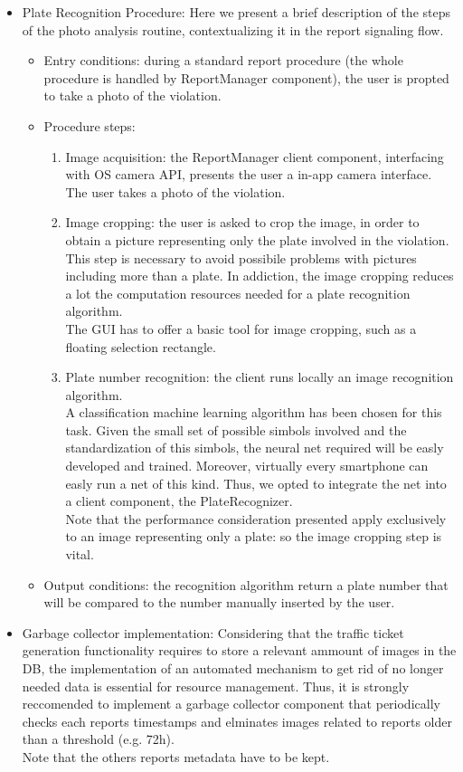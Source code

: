 \begin{itemize}
	\item Plate Recognition Procedure: Here we present a brief description of the steps of the photo analysis routine, contextualizing it in the report signaling flow.
	\begin{itemize}
		\item Entry conditions: during a standard report procedure (the whole procedure is handled by ReportManager component), the user is propted to take a photo of the violation.
		\item  Procedure steps:
		\begin{enumerate}
			\item Image acquisition: the ReportManager client component, interfacing with OS camera API, presents the user a in-app camera interface. The user takes a photo of the violation.
			\item Image cropping: the user is asked to crop the image, in order to obtain a picture representing only the plate involved in the violation. This step is necessary to avoid possibile problems with pictures including more than a plate. In addiction, the image cropping reduces a lot the computation resources needed for a plate recognition algorithm.\\
		The GUI has to offer a basic tool for image cropping, such as a floating selection rectangle.
			\item Plate number recognition:  the client runs locally an image recognition algorithm. \\
		A classification machine learning algorithm has been chosen for this task. Given the small set of possible simbols involved and the standardization of this simbols, the neural net required will be easly developed and trained. Moreover, virtually every smartphone can easly run a net of this kind. Thus, we opted to integrate the net into a client component, the PlateRecognizer.\\
		Note that the performance consideration presented apply exclusively to an image representing only a plate: so the image cropping step is vital.
		\end{enumerate}
	\item Output conditions: the recognition algorithm return a plate number that will be compared to the number manually inserted by the user.
	\end{itemize}
	
	\item Garbage collector implementation: Considering that the traffic ticket generation functionality requires to store a relevant ammount of images in the DB, the implementation of an automated mechanism to get rid of no longer needed data is essential for resource management. Thus, it is strongly reccomended to implement a garbage collector component that periodically checks each reports timestamps and elminates images related to reports older than a threshold (e.g. 72h).\\
	Note that the others reports metadata have to be kept.
	

\end{itemize}
